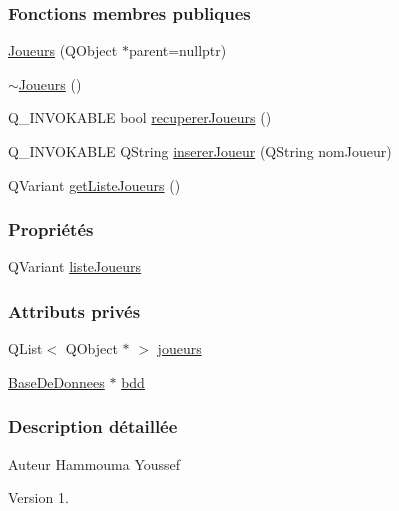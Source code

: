 \subsubsection*{Fonctions membres publiques}
\begin{DoxyCompactItemize}
\item 
\hyperlink{class_joueurs_ac0f9bfbacdcda2622d7438d0445200e8}{Joueurs} (Q\+Object $\ast$parent=nullptr)
\item 
\hyperlink{class_joueurs_ab2b4280d9ad7be92ef78c2ca15755318}{$\sim$\+Joueurs} ()
\item 
Q\+\_\+\+I\+N\+V\+O\+K\+A\+B\+LE bool \hyperlink{class_joueurs_a5bd70438c6624d8dca765e322285eb61}{recuperer\+Joueurs} ()
\item 
Q\+\_\+\+I\+N\+V\+O\+K\+A\+B\+LE Q\+String \hyperlink{class_joueurs_ad41325dbd0611773c6e9fd8a814be1b3}{inserer\+Joueur} (Q\+String nom\+Joueur)
\item 
Q\+Variant \hyperlink{class_joueurs_aec63d4e2fe1bf7fbf33489c1a8d3bbbf}{get\+Liste\+Joueurs} ()
\end{DoxyCompactItemize}
\subsubsection*{Propriétés}
\begin{DoxyCompactItemize}
\item 
Q\+Variant \hyperlink{class_joueurs_a809d64435e34f4f7f0218d4616b727c0}{liste\+Joueurs}
\end{DoxyCompactItemize}
\subsubsection*{Attributs privés}
\begin{DoxyCompactItemize}
\item 
Q\+List$<$ Q\+Object $\ast$ $>$ \hyperlink{class_joueurs_a86c2a21b5a6b83f9a43f9a957a020fd7}{joueurs}
\item 
\hyperlink{class_base_de_donnees}{Base\+De\+Donnees} $\ast$ \hyperlink{class_joueurs_ac060c3017311b67a97ed488ce2bb2332}{bdd}
\end{DoxyCompactItemize}


\subsubsection{Description détaillée}
\begin{DoxyAuthor}{Auteur}
Hammouma Youssef
\end{DoxyAuthor}
\begin{DoxyVersion}{Version}
1. 
\end{DoxyVersion}


